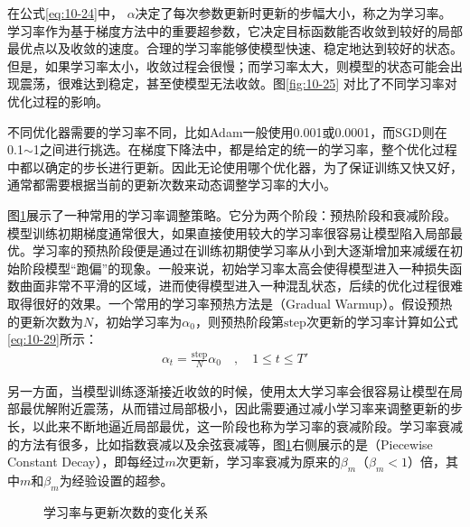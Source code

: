 \parinterval 在公式\eqref{eq:10-24}中， $\alpha$决定了每次参数更新时更新的步幅大小，称之为学习率。学习率作为基于梯度方法中的重要超参数，它决定目标函数能否收敛到较好的局部最优点以及收敛的速度。合理的学习率能够使模型快速、稳定地达到较好的状态。但是，如果学习率太小，收敛过程会很慢；而学习率太大，则模型的状态可能会出现震荡，很难达到稳定，甚至使模型无法收敛。图\ref{fig:10-25} 对比了不同学习率对优化过程的影响。

\parinterval 不同优化器需要的学习率不同，比如Adam一般使用0.001或0.0001，而SGD则在0.1$\sim$1之间进行挑选。在梯度下降法中，都是给定的统一的学习率，整个优化过程中都以确定的步长进行更新。因此无论使用哪个优化器，为了保证训练又快又好，通常都需要根据当前的更新次数来动态调整学习率的大小。
\vspace{0.5em}


\parinterval 图\ref{fig:10-26}展示了一种常用的学习率调整策略。它分为两个阶段：预热阶段和衰减阶段。模型训练初期梯度通常很大，如果直接使用较大的学习率很容易让模型陷入局部最优。学习率的预热阶段便是通过在训练初期使学习率从小到大逐渐增加来减缓在初始阶段模型“跑偏”的现象。一般来说，初始学习率太高会使得模型进入一种损失函数曲面非常不平滑的区域，进而使得模型进入一种混乱状态，后续的优化过程很难取得很好的效果。一个常用的学习率预热方法是{\small{}}（Gradual Warmup）。假设预热的更新次数为$N$，初始学习率为$\alpha_0$，则预热阶段第$\textrm{step}$次更新的学习率计算如公式\eqref{eq:10-29}所示：
\begin{eqnarray}
\alpha_t = \frac{\textrm{step}}{N} \alpha_0 \quad,\quad 1 \leq t \leq T'
\label{eq:10-29}
\end{eqnarray}

\noindent 另一方面，当模型训练逐渐接近收敛的时候，使用太大学习率会很容易让模型在局部最优解附近震荡，从而错过局部极小，因此需要通过减小学习率来调整更新的步长，以此来不断地逼近局部最优，这一阶段也称为学习率的衰减阶段。学习率衰减的方法有很多，比如指数衰减以及余弦衰减等，图\ref{fig:10-26}右侧展示的是{\small{}}（Piecewise Constant Decay），即每经过$m$次更新，学习率衰减为原来的$\beta_m$（$\beta_m<1$）倍，其中$m$和$\beta_m$为经验设置的超参。

\begin{figure}[htp]
\centering

\caption{学习率与更新次数的变化关系}
\label{fig:10-26}
\end{figure}

